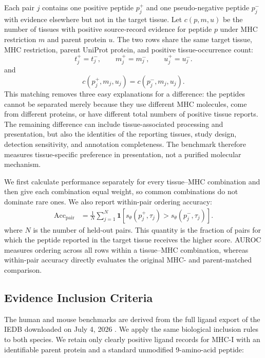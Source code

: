 \documentclass[webpdf,modern,large,nocrop,noinfo]{oup-authoring-template}
\newcommand{\plainMHC}{MHC}
\newcommand{\plainMHCI}{MHC-I}
\newcommand{\plainIEDB}{IEDB}
\begin{document}
Each pair \(j\) contains one positive peptide \(p_j^{+}\) and one pseudo-negative peptide \(p_j^{-}\) with evidence elsewhere but not in the target tissue. Let \(c(p,m,u)\) be the number of tissues with positive source-record evidence for peptide \(p\) under MHC restriction \(m\) and parent protein \(u\). The two rows share the same target tissue, MHC restriction, parent UniProt protein, and positive tissue-occurrence count:
\[
t_j^{+}=t_j^{-}, \qquad
m_j^{+}=m_j^{-}, \qquad
u_j^{+}=u_j^{-}.
\]
and
\[
c(p_j^{+},m_j,u_j)=c(p_j^{-},m_j,u_j).
\]
This matching removes three easy explanations for a difference: the peptides cannot be separated merely because they use different \plainMHC{} molecules, come from different proteins, or have different total numbers of positive tissue reports. The remaining difference can include tissue-associated processing and presentation, but also the identities of the reporting tissues, study design, detection sensitivity, and annotation completeness. The benchmark therefore measures tissue-specific preference in presentation, not a purified molecular mechanism.

We first calculate performance separately for every tissue--MHC combination and then give each combination equal weight, so common combinations do not dominate rare ones. We also report within-pair ordering accuracy:
\[
\begin{aligned}
    \operatorname{Acc}_{\mathrm{pair}}
&=
\frac{1}{N}\sum_{j=1}^{N}
\mathbf{1}\!\left[
s_{\theta}(p_j^{+},\tau_j)
>
s_{\theta}(p_j^{-},\tau_j)
\right].
\end{aligned}
\]
where \(N\) is the number of held-out pairs. This quantity is the fraction of pairs for which the peptide reported in the target tissue receives the higher score. AUROC measures ordering across all rows within a tissue--MHC combination, whereas within-pair accuracy directly evaluates the original MHC- and parent-matched comparison.

\subsection{Evidence Inclusion Criteria}
\label{sec:evidence-inclusion}

The human and mouse benchmarks are derived from the full ligand export of the \plainIEDB{} downloaded on July 4, 2026 \cite{vita2025iedb}. We apply the same biological inclusion rules to both species. We retain only clearly positive ligand records for \plainMHCI{} with an identifiable parent protein and a standard unmodified 9-amino-acid peptide:
\end{document}
